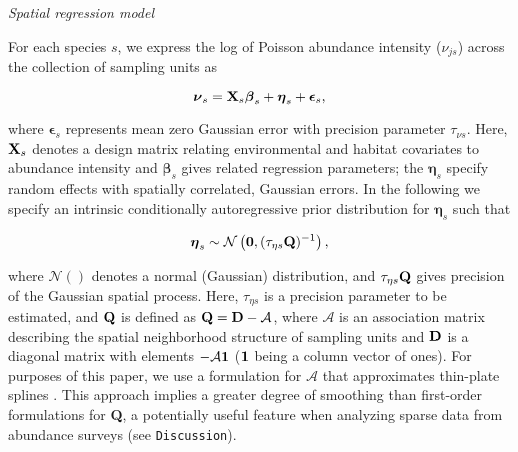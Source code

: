 \documentclass[12pt,fleqn]{article}
\begin{document}
\begin{flushleft}
\vspace{.15in}
{\it Spatial regression model} \\
\vspace{.15in}

For each species $s$, we express the log of Poisson abundance intensity ($\nu_{js}$) across the collection of sampling units as
\begin{linenomath*}
\begin{equation}
 \label{eq:spat_reg}
 \boldsymbol{\nu}_s = {\bf X}_s \boldsymbol{\beta}_s + \boldsymbol{\eta}_s + \boldsymbol{\epsilon}_s,
\end{equation}
\end{linenomath*}
where $\boldsymbol{\epsilon}_s$ represents mean zero Gaussian error with precision parameter $\tau_{\nu s}$.
Here, ${\bf X}_s$ denotes a design matrix relating environmental and habitat covariates to abundance intensity and $\boldsymbol{\beta}_s$ gives related regression parameters; the $\boldsymbol{\eta}_s$ specify random effects with spatially correlated, Gaussian errors.  In the following we specify an intrinsic conditionally autoregressive prior distribution \citep[ICAR;][]{BesagKooperberg1995,RueHeld2005} for $\boldsymbol{\eta}_s$ such  that
\begin{linenomath*}
\begin{equation*}
 \boldsymbol{\eta}_s \sim \mathcal{N}\left( {\bf 0},(\tau_{\eta s}{\bf Q})^{-1} \right),
\end{equation*}
\end{linenomath*}
where $\mathcal{N}()$ denotes a normal (Gaussian) distribution, and $\tau_{\eta s}{\bf Q}$ gives precision of the Gaussian spatial process.  Here, $\tau_{\eta s}$  is a precision parameter to be estimated, and ${\bf Q}$ is defined as ${\bf Q}={\bf D}-\mathcal{A}$, where $\mathcal{A}$ is an association matrix describing the spatial neighborhood structure of sampling units and ${\bf D}$ is a diagonal matrix with elements $-\mathcal{A} {\bf 1}$ (${\bf 1}$ being a column vector of ones).  For purposes of this paper, we use a formulation for $\mathcal{A}$ that approximates thin-plate splines \citep[][section 3.4.2]{RueHeld2005}.  This approach implies a greater degree of smoothing than first-order formulations for {\bf Q}, a potentially useful feature when analyzing sparse data from abundance surveys (see \texttt{Discussion}).


\end{flushleft}
\end{document}
